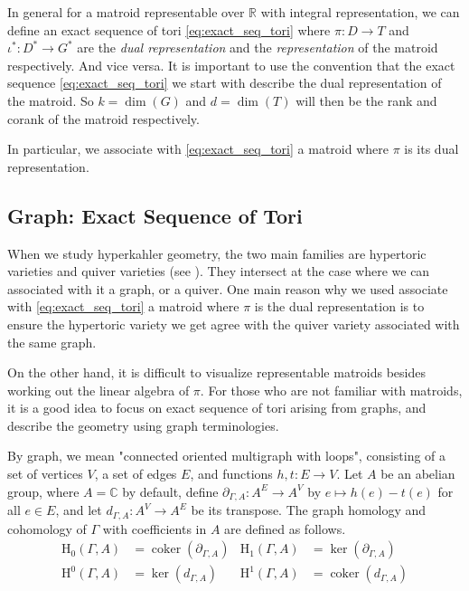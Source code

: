 \documentclass[b5paper]{article}
\newcommand{\HH}{\mathrm{H}}
\newcommand{\coker}{\operatorname{coker}}
\begin{document}
In general for a matroid representable over $\mathbb{R}$ with integral representation, we can define an exact sequence of tori \ref{eq:exact_seq_tori} where $\pi:D\rightarrow T$ and $\iota^*:D^*\rightarrow G^*$ are the \emph{dual representation} and the \emph{representation} of the matroid respectively. And vice versa. It is important to use the convention that the exact sequence \ref{eq:exact_seq_tori} we start with describe the dual representation of the matroid.
So $k=\dim(G)$ and $d=\dim(T)$ will then be the rank and corank of the matroid respectively. 

In particular, we associate with \ref{eq:exact_seq_tori} a matroid where $\pi$ is its dual representation.

\subsection{Graph: Exact Sequence of Tori}

When we study hyperkahler geometry, the two main families are hypertoric varieties and quiver varieties (see ). They intersect at the case where we can associated with it a graph, or a quiver. One main reason why we used associate with \ref{eq:exact_seq_tori} a matroid where $\pi$ is the dual representation is to ensure the hypertoric variety we get agree with the quiver variety associated with the same graph.

On the other hand, it is difficult to visualize representable matroids besides working out the linear algebra of $\pi$. For those who are not familiar with matroids, it is a good idea to focus on exact sequence of tori arising from graphs, and describe the geometry using graph terminologies. 

By graph, we mean "connected oriented multigraph with loops", consisting of a set of vertices $V$, a set of edges $E$, and functions $h,t:E\rightarrow V$.
Let $A$ be an abelian group, where $A=\mathbb{C}$ by default, define $ \partial_{\Gamma, A} : A^E \to A^V $ by $ e \mapsto h(e) - t(e) $ for all $ e \in E $, and let $ d_{\Gamma, A} : A^V \to A^E $ be its transpose.
The graph homology and cohomology of $\Gamma$ with coefficients in $A$ are defined as follows.
\begin{align*}
  \HH_0(\Gamma, A) &= \coker(\partial_{\Gamma, A}) & \HH_1(\Gamma, A) &= \ker(\partial_{\Gamma, A}) \\
  \HH^0(\Gamma, A) &= \ker(d_{\Gamma, A}) & \HH^1(\Gamma, A) &= \coker(d_{\Gamma, A})
\end{align*}
\end{document}
